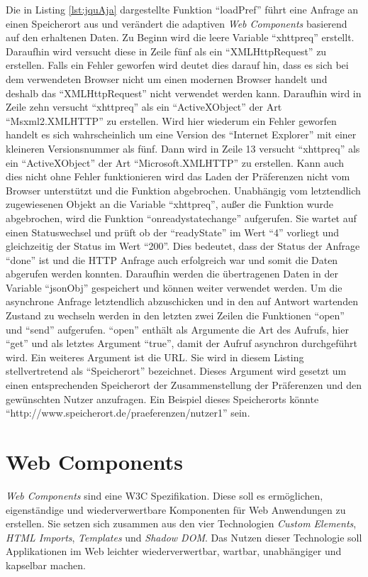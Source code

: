 \documentclass[12pt, paper=a4, bibtotoc, toc=listof, headsepline=true]{scrreprt}
\begin{document}
Die in Listing \ref{lst:jquAja} dargestellte Funktion \enquote{loadPref} führt eine Anfrage an einen Speicherort aus und verändert die adaptiven \emph{Web Components} basierend auf den erhaltenen Daten. Zu Beginn wird die leere Variable \enquote{xhttpreq} erstellt. Daraufhin wird versucht diese in Zeile fünf als ein \enquote{XMLHttpRequest} zu erstellen. Falls ein Fehler geworfen wird deutet dies darauf hin, dass es sich bei dem verwendeten Browser nicht um einen modernen Browser handelt und deshalb das \enquote{XMLHttpRequest} nicht verwendet werden kann. Daraufhin wird in Zeile zehn versucht \enquote{xhttpreq} als ein \enquote{ActiveXObject} der Art \enquote{Msxml2.XMLHTTP} zu erstellen. Wird hier wiederum ein Fehler geworfen handelt es sich wahrscheinlich um eine Version des \enquote{Internet Explorer} mit einer kleineren Versionsnummer als fünf. Dann wird in Zeile 13 versucht \enquote{xhttpreq} als ein \enquote{ActiveXObject} der Art \enquote{Microsoft.XMLHTTP} zu erstellen. Kann auch dies nicht ohne Fehler funktionieren wird das Laden der Präferenzen nicht vom Browser unterstützt und die Funktion abgebrochen. Unabhängig vom letztendlich zugewiesenen Objekt an die Variable \enquote{xhttpreq}, außer die Funktion wurde abgebrochen,  wird die Funktion \enquote{onreadystatechange} aufgerufen. Sie wartet auf einen Statuswechsel und prüft ob der \enquote{readyState} im Wert \enquote{4} vorliegt und gleichzeitig der Status im Wert \enquote{200}. Dies bedeutet, dass der Status der Anfrage \enquote{done} ist und die \ac{HTTP} Anfrage auch erfolgreich war und somit die Daten abgerufen werden konnten. Daraufhin werden die übertragenen Daten in der Variable \enquote{jsonObj} gespeichert und können weiter verwendet werden. Um die asynchrone Anfrage letztendlich abzuschicken und in den auf Antwort wartenden Zustand zu wechseln werden in den letzten zwei Zeilen die Funktionen \enquote{open} und \enquote{send} aufgerufen. \enquote{open} enthält als Argumente die Art des Aufrufs, hier \enquote{get} und als letztes Argument \enquote{true}, damit der Aufruf asynchron durchgeführt wird. Ein weiteres Argument ist die \ac{URL}. Sie wird in diesem Listing stellvertretend als \enquote{Speicherort} bezeichnet. Dieses Argument wird gesetzt um einen entsprechenden Speicherort der Zusammenstellung der Präferenzen und den gewünschten Nutzer anzufragen. Ein Beispiel dieses Speicherorts könnte \newline \enquote{http://www.speicherort.de/praeferenzen/nutzer1} sein\cite{xmlhttp}.
		
\chapter{Web Components}
	\emph{Web Components} sind eine \ac{W3C} Spezifikation. Diese soll es ermöglichen, eigenständige und wiederverwertbare Komponenten für Web Anwendungen zu erstellen\cite[S. 1]{patel2015learning}. Sie setzen sich zusammen aus den vier Technologien \emph{Custom Elements}, \emph{\ac{HTML} Imports}, \emph{Templates} und \emph{Shadow \ac{DOM}}. Das Nutzen dieser Technologie soll Applikationen im Web leichter wiederverwertbar, wartbar, unabhängiger und kapselbar machen\cite[S.2]{patel2015learning}.
\end{document}
